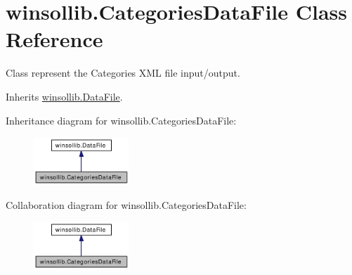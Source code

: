 \hypertarget{classwinsollib_1_1CategoriesDataFile}{
\section{winsollib.Categories\-Data\-File Class Reference}
\label{classwinsollib_1_1CategoriesDataFile}
}
Class represent the Categories XML file input/output.  


Inherits \hyperlink{classwinsollib_1_1DataFile}{winsollib.Data\-File}.

Inheritance diagram for winsollib.Categories\-Data\-File:\begin{figure}[H]
\begin{center}
\leavevmode
\includegraphics[width=101pt]{classwinsollib_1_1CategoriesDataFile__inherit__graph}
\end{center}
\end{figure}
Collaboration diagram for winsollib.Categories\-Data\-File:\begin{figure}[H]
\begin{center}
\leavevmode
\includegraphics[width=101pt]{classwinsollib_1_1CategoriesDataFile__coll__graph}
\end{center}
\end{figure}
